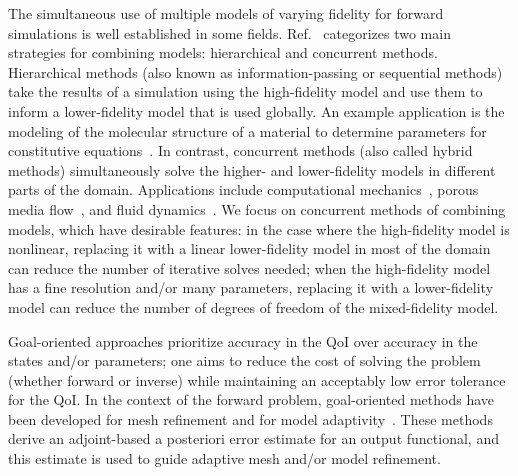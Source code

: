 The simultaneous use of multiple models of varying fidelity for forward simulations is well established in some fields. Ref.~\cite{Liuetal03} categorizes two main strategies for combining models: hierarchical and concurrent methods. Hierarchical methods (also known as information-passing or sequential methods) take the results of a simulation using the high-fidelity model and use them to inform a lower-fidelity model that is used globally. An example application is the modeling of the molecular structure of a material to determine parameters for constitutive equations~\cite{Haoetal03,Weietal04}. In contrast, concurrent methods (also called hybrid methods) simultaneously solve the higher- and lower-fidelity models in different parts of the domain. Applications include computational mechanics~\cite{Khareetal08,Prudetal08}, porous media flow~\cite{tartakovsky2008hybrid,battiato2011hybrid}, and fluid dynamics~\cite{AlexGarTar02,FatGerQua01,Garcetal99,LucKinBer02,vanOpstaletal15,WadErw90}. We focus on concurrent methods of combining models, which have desirable features: in the case where the high-fidelity model is nonlinear, replacing it with a linear lower-fidelity model in most of the domain can reduce the number of iterative solves needed; when the high-fidelity model has a fine resolution and/or many parameters, replacing it with a lower-fidelity model can reduce the number of degrees of freedom of the mixed-fidelity model.

Goal-oriented approaches prioritize accuracy in the QoI over accuracy in the states and/or parameters; one aims to reduce the cost of solving the problem (whether forward or inverse) while maintaining an acceptably low error tolerance for the QoI. In the context of the forward problem, goal-oriented methods have been developed for mesh refinement \cite{BecRann01,Park04,PrudOden99,VendDarm00,Yano12} and for model adaptivity~\cite{BraackErn03,OdenPrudetal06}. These methods derive an adjoint-based a posteriori error estimate for an output functional, and this estimate is used to guide adaptive mesh and/or model refinement. %

